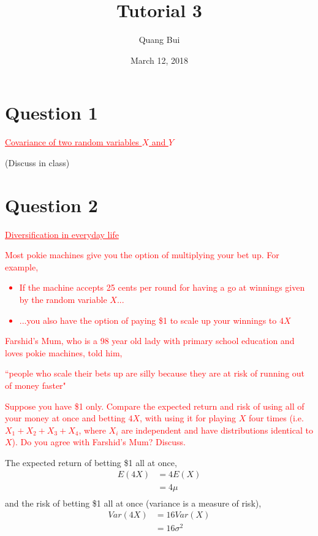\documentclass[12pt]{report}
\title{Tutorial 3}
\author{Quang Bui}
\subtitle
{
	\textbf{keywords}: covariance, expected value, diversification, variance, risk, vector, matrix
	
	\textbf{estimated reading time}: 30 minutes
}
\date{March 12, 2018}
\begin{document}
	
\maketitle

\newpage
\section*{Question 1}
\textcolor{red}{\underline{Covariance of two random variables $X$ and $Y$}}

\noindent (Discuss in class)

\newpage
\section*{Question 2}
\textcolor{red}{\underline{Diversification in everyday life}}

\noindent \textcolor{red}{Most pokie machines give you the option of multiplying your bet up. For example,}
\noindent \textcolor{red}{
	\begin{itemize}
	\item If the machine accepts 25 cents per round for having a go at winnings given by the random variable $X$...
	\item ...you also have the option of paying \$1 to scale up your winnings to $4X$
\end{itemize}
}
\noindent \textcolor{red}{Farshid's Mum, who is a 98 year old lady with primary school education and loves pokie machines, told him,}
\noindent \textcolor{red}{\begin{center}
		``people who scale their bets up are silly because they are at risk of running out of money faster"
	\end{center}
}
\noindent \textcolor{red}{Suppose you have \$1 only. Compare the expected return and risk of using all of your money at once and betting $4X$, with using it for playing $X$ four times (i.e. $X_1+X_2+X_3+X_4$, where $X_i$ are independent and have distributions identical to $X$). Do you agree with Farshid's Mum? Discuss.}

\noindent The expected return of betting \$1 all at once,
\begin{align*}
E(4X)&=4E(X) \\
&=4\mu \\
\end{align*}
\noindent and the risk of betting \$1 all at once (variance is a measure of risk),
\begin{align*}
Var(4X)&=16Var(X) \\
&=16\sigma^2
\end{align*}
\end{document}
